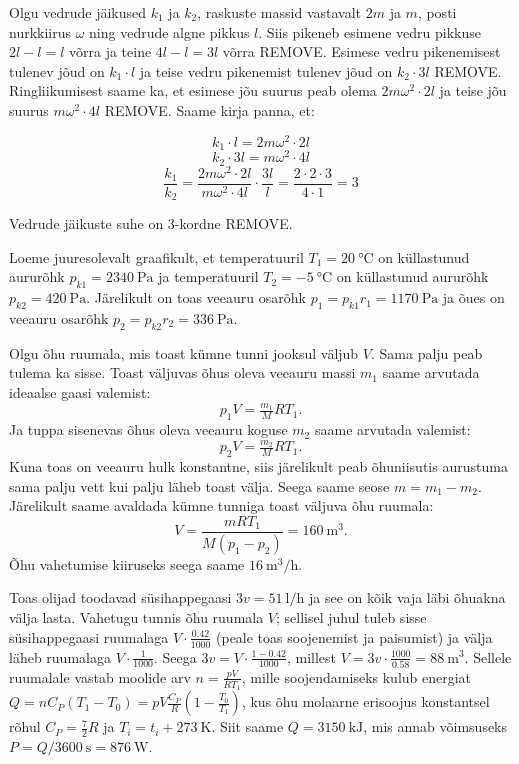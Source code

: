 \documentclass[10pt]{article}
\newcommand{\p}[1]{REMOVE}
\begin{document}
\solu
Olgu vedrude jäikused $k_1$ ja $k_2$, raskuste massid vastavalt $2m$ ja $m$, posti nurkkiirus $\omega$ ning vedrude algne pikkus $l$. Siis pikeneb esimene vedru pikkuse $2l - l = l$ võrra ja teine $4l - l = 3l$ võrra \p{1}. Esimese vedru pikenemisest tulenev jõud on $k_1 \cdot l$ ja teise vedru pikenemist tulenev jõud on $k_2 \cdot 3l$ \p{2}. Ringliikumisest saame ka, et esimese jõu suurus peab olema $2m \omega^2 \cdot 2l$ ja teise jõu suurus $m \omega^2 \cdot 4l$ \p{2}. Saame kirja panna, et:

$$k_1 \cdot l = 2m \omega^2 \cdot 2l$$
$$k_2 \cdot 3l = m \omega^2 \cdot 4l$$
$$\frac{k_1}{k_2} = \frac{2m \omega^2 \cdot 2l}{m \omega^2 \cdot 4l} \cdot \frac{3l}{l} = \frac{2 \cdot 2 \cdot 3}{4 \cdot 1} = 3$$

Vedrude jäikuste suhe on 3-kordne \p{3}.
\probend
\bigskip


\solu
\par
Loeme juuresolevalt graafikult, et temperatuuril $T_1 = \SI{20}{\celsius}$ on küllastunud aururõhk $p_{k1} = \SI{2340}{\pascal}$ ja temperatuuril $T_2 = \SI{-5}{\celsius}$ on küllastunud aururõhk $p_{k2} = \SI{420}{\pascal}$. Järelikult on toas veeauru osarõhk $p_1 = p_{k1} r_1 = \SI{1170}{\pascal}$ ja õues on veeauru osarõhk $p_2 = p_{k2} r_2 = \SI{336}{\pascal}$.

Olgu õhu ruumala, mis toast kümne tunni jooksul väljub $V$. Sama palju peab tulema ka sisse.
Toast väljuvas õhus oleva veeauru massi $m_1$ saame arvutada ideaalse gaasi valemist:
$$p_1V = \tfrac {m_1}M RT_1.$$
Ja tuppa sisenevas õhus oleva veeauru koguse $m_2$ saame arvutada valemist:
$$p_2V = \tfrac {m_2}M RT_1.$$
Kuna toas on veeauru hulk konstantne, siis järelikult peab õhuniisutis aurustuma sama palju vett kui palju läheb toast välja. Seega saame seose $m = m_1 - m_2$. Järelikult saame avaldada kümne tunniga toast väljuva õhu ruumala:
$$V = \frac{mRT_1}{M(p_1-p_2)} = \SI{160}{\meter\cubed}.$$
Õhu vahetumise kiiruseks seega saame $\SI{16}{\meter\cubed\per\hour}$.
\probend
\bigskip


\solu
Toas olijad toodavad süsihappegaasi $3v=\SI{51}{\litre\per\hour}$ ja see on kõik vaja läbi õhuakna välja lasta. Vahetugu tunnis õhu ruumala $V$; sellisel juhul tuleb sisse süsihappegaasi ruumalaga $V\cdot \frac{0.42}{1000}$ (peale toas soojenemist ja paisumist) ja välja läheb ruumalaga $V\cdot \frac{1}{1000}$. Seega $3v=V\cdot \frac{1-0.42}{1000}$, millest $V=3v\cdot \frac{1000}{0.58}=\SI{88}{\m\cubed}$. Sellele ruumalale vastab moolide arv $n=\frac{pV}{RT_1}$, mille soojendamiseks kulub energiat $Q=nC_P(T_1-T_0)=pV \frac{C_P}R(1-\frac{T_0}{T_1})$, kus õhu molaarne  erisoojus konstantsel rõhul $C_P=\frac 72R$ ja $T_i=t_i+\SI{273}{\kelvin}$.
Siit saame $Q=\SI{3150}{\kilo\J}$, mis annab võimsuseks $P=Q/\SI{3600}{\s}=\SI{876}\watt$.
\probend
\bigskip
\end{document}

